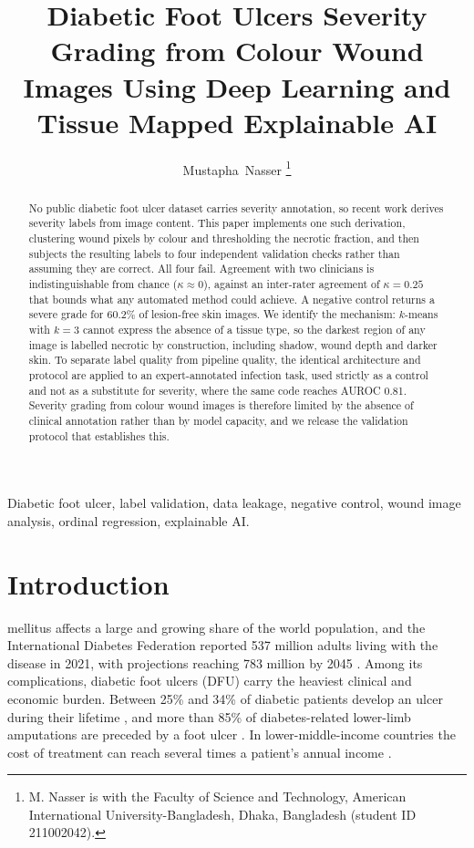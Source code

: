 \title{Diabetic Foot Ulcers Severity Grading from Colour Wound
Images Using Deep Learning and Tissue Mapped Explainable AI}

\author{Mustapha~Nasser%
\thanks{M. Nasser is with the Faculty of Science and Technology,
American International University-Bangladesh, Dhaka, Bangladesh
(student ID 211002042).}}

\maketitle

\begin{abstract}
No public diabetic foot ulcer dataset carries severity annotation, so
recent work derives severity labels from image content. This paper
implements one such derivation, clustering wound pixels by colour and
thresholding the necrotic fraction, and then subjects the resulting
labels to four independent validation checks rather than assuming they
are correct. All four fail. Agreement with two clinicians is
indistinguishable from chance ($\kappa \approx 0$), against an
inter-rater agreement of $\kappa = 0.25$ that bounds what any automated
method could achieve. A negative control returns a severe grade for
60.2\% of lesion-free skin images. We identify the mechanism: $k$-means
with $k=3$ cannot express the absence of a tissue type, so the darkest
region of any image is labelled necrotic by construction, including
shadow, wound depth and darker skin. To separate label quality from
pipeline quality, the identical architecture and protocol are applied to
an expert-annotated infection task, used strictly as a control and not as
a substitute for severity, where the same code reaches AUROC 0.81.
Severity grading from colour wound images is therefore limited by the
absence of clinical annotation rather than by model capacity, and we
release the validation protocol that establishes this.
\end{abstract}

\begin{IEEEkeywords}
Diabetic foot ulcer, label validation, data leakage, negative control,
wound image analysis, ordinal regression, explainable AI.
\end{IEEEkeywords}

\section{Introduction}

 mellitus affects a large and growing share of the
world population, and the International Diabetes Federation reported 537
million adults living with the disease in 2021, with projections reaching
783 million by 2045 \cite{idf2021}. Among its complications, diabetic foot
ulcers (DFU) carry the heaviest clinical and economic burden. Between 25\%
and 34\% of diabetic patients develop an ulcer during their lifetime
\cite{armstrong2017}, and more than 85\% of diabetes-related lower-limb
amputations are preceded by a foot ulcer \cite{pecoraro1990}. In
lower-middle-income countries the cost of treatment can reach several times
a patient's annual income \cite{cavanagh2012}.

